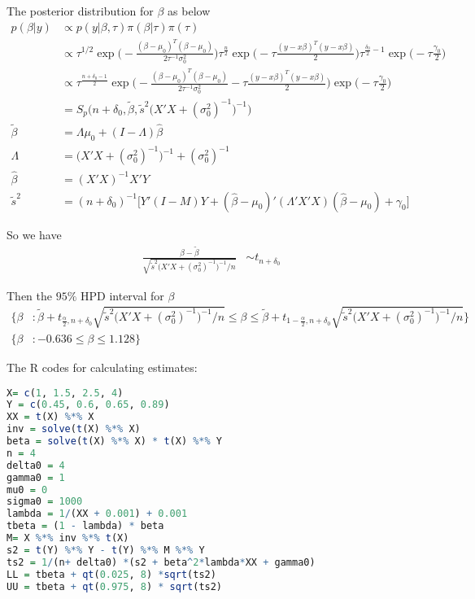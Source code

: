 \begin{itemize}
The posterior distribution for $\beta$ as below
\begin{align*}
 p(\beta | y) & \propto p(y | \beta, \tau) \pi(\beta | \tau) \pi(\tau) \\
 & \propto  \tau^{1/2}  \exp \Big( -\frac{(\beta - \mu_0)^T (\beta - \mu_0)}{2 \tau^{-1} \sigma_0^2} \Big) \tau^{\frac{n}{2}} \exp \Big(- \tau \frac{(y- x \beta)^T (y- x \beta)}{2} \Big) \tau^{\frac{\delta_0}{2}-1} \exp \Big(-\tau \frac{\gamma_0}{2} \Big) \\
 & \propto \tau^{\frac{n+ \delta_0 -1}{2}} \exp \Big( -\frac{(\beta - \mu_0)^T (\beta - \mu_0)}{2 \tau^{-1} \sigma_0^2} - \tau \frac{(y- x \beta)^T (y- x \beta)}{2}  \Big) \exp \Big(-\tau \frac{\gamma_0}{2} \Big) \\
 & = S_p \Bigg ( n+ \delta_0, \tilde{\beta}, \tilde{s}^2  \Big (X'X + (\sigma_0^2)^{-1} \Big )^{-1} \Bigg ) \\
 \tilde{\beta} &= \Lambda \mu_0 + (I- \Lambda) \hat{\beta} \\
 \Lambda &=  \Big (X'X + (\sigma_0^2)^{-1} \Big )^{-1} + (\sigma_0^2)^{-1} \\
 \hat{\beta} &= (X'X)^{-1} X'Y \\
 \tilde{s}^2 &= (n + \delta_0)^{-1} \Big[Y' (I-M) Y + (\hat{\beta} - \mu_0)' (\Lambda' X' X) (\hat{\beta} - \mu_0) + \gamma_0 \Big]
\end{align*}

So we have
\begin{align*}
 \frac{\beta - \tilde{\beta}}{\sqrt {\tilde{s}^2  \Big (X'X + (\sigma_0^2)^{-1} \Big )^{-1} \Big / n}} & \sim t_{n + \delta_0}
\end{align*}

Then the $95\%$ HPD interval for $\beta$
\begin{align*}
 \Bigg \{ \beta &:  \tilde{\beta} +  t_{\frac{\alpha}{2}, n + \delta_0} \sqrt {\tilde{s}^2  \Big (X'X + (\sigma_0^2)^{-1} \Big )^{-1} \Big / n} \leq  \beta \leq  \tilde{\beta} +  t_{1-\frac{\alpha}{2}, n + \delta_0} \sqrt {\tilde{s}^2  \Big (X'X + (\sigma_0^2)^{-1} \Big )^{-1} \Big / n}  \Bigg \} \\
 \Bigg \{ \beta &: -0.636 \leq  \beta \leq  1.128 \Bigg \}
\end{align*}

The R codes for calculating estimates:

\begin{lstlisting}[language=R]
X= c(1, 1.5, 2.5, 4) 
Y = c(0.45, 0.6, 0.65, 0.89)
XX = t(X) %*% X
inv = solve(t(X) %*% X)
beta = solve(t(X) %*% X) * t(X) %*% Y
n = 4
delta0 = 4
gamma0 = 1
mu0 = 0
sigma0 = 1000
lambda = 1/(XX + 0.001) + 0.001
tbeta = (1 - lambda) * beta
M= X %*% inv %*% t(X)
s2 = t(Y) %*% Y - t(Y) %*% M %*% Y
ts2 = 1/(n+ delta0) *(s2 + beta^2*lambda*XX + gamma0)
LL = tbeta + qt(0.025, 8) *sqrt(ts2) 
UU = tbeta + qt(0.975, 8) * sqrt(ts2) 
\end{lstlisting}


\end{itemize}

